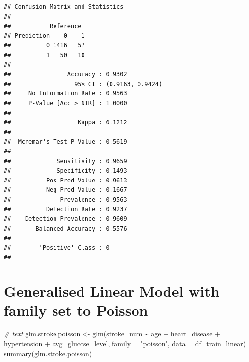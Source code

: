 \documentclass[
]{article}
\newenvironment{Shaded}{\begin{snugshade}}{\end{snugshade}}
\newcommand{\AttributeTok}[1]{\textcolor[rgb]{0.77,0.63,0.00}{#1}}
\newcommand{\CommentTok}[1]{\textcolor[rgb]{0.56,0.35,0.01}{\textit{#1}}}
\newcommand{\FunctionTok}[1]{\textcolor[rgb]{0.00,0.00,0.00}{#1}}
\newcommand{\NormalTok}[1]{#1}
\newcommand{\OtherTok}[1]{\textcolor[rgb]{0.56,0.35,0.01}{#1}}
\newcommand{\SpecialCharTok}[1]{\textcolor[rgb]{0.00,0.00,0.00}{#1}}
\newcommand{\StringTok}[1]{\textcolor[rgb]{0.31,0.60,0.02}{#1}}
\renewcommand{\=}[1]{\stackrel{#1}{=}}
\theoremstyle{definition}
\theoremstyle{remark}
\begin{document}
\begin{verbatim}
## Confusion Matrix and Statistics
## 
##           Reference
## Prediction    0    1
##          0 1416   57
##          1   50   10
##                                           
##                Accuracy : 0.9302          
##                  95% CI : (0.9163, 0.9424)
##     No Information Rate : 0.9563          
##     P-Value [Acc > NIR] : 1.0000          
##                                           
##                   Kappa : 0.1212          
##                                           
##  Mcnemar's Test P-Value : 0.5619          
##                                           
##             Sensitivity : 0.9659          
##             Specificity : 0.1493          
##          Pos Pred Value : 0.9613          
##          Neg Pred Value : 0.1667          
##              Prevalence : 0.9563          
##          Detection Rate : 0.9237          
##    Detection Prevalence : 0.9609          
##       Balanced Accuracy : 0.5576          
##                                           
##        'Positive' Class : 0               
## 
\end{verbatim}

\hypertarget{generalised-linear-model-with-family-set-to-poisson}{%
\section{Generalised Linear Model with family set to Poisson}\label{generalised-linear-model-with-family-set-to-poisson}}

\begin{Shaded}
\begin{Highlighting}[]
\CommentTok{\# text}
\NormalTok{glm.stroke.poisson }\OtherTok{\textless{}{-}} \FunctionTok{glm}\NormalTok{(stroke\_num }\SpecialCharTok{\textasciitilde{}}\NormalTok{ age }\SpecialCharTok{+}\NormalTok{ heart\_disease }\SpecialCharTok{+}\NormalTok{ hypertension }\SpecialCharTok{+}\NormalTok{ avg\_glucose\_level,}
\AttributeTok{family =} \StringTok{"poisson"}\NormalTok{,}
\AttributeTok{data =}\NormalTok{ df\_train\_linear)}
\FunctionTok{summary}\NormalTok{(glm.stroke.poisson)}
\end{Highlighting}
\end{Shaded}
\end{document}
